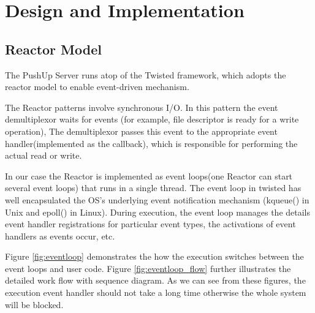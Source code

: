 \section {Design and Implementation\\}

\subsection{Reactor Model\\}
The PushUp Server runs atop of the Twisted framework\cite{Twisted}, which 
adopts the reactor model\cite{Reactor} to enable event-driven mechanism. 

The Reactor patterns involve synchronous I/O. In this pattern the event 
demultiplexor waits for events (for example, file descriptor is 
ready for a write operation), The demultiplexor passes this event to the
appropriate event handler(implemented as the callback), which is 
responsible for performing the actual read or write.

In our case the Reactor is implemented as event loops(one Reactor 
can start several event loops) that runs in a single thread. The
event loop in twisted has well encapsulated the OS's underlying 
event notification mechanism (kqueue() in Unix and epoll() in Linux).
During execution, the event loop manages the details event handler 
registrations for particular event types, the activations of event 
handlers as events occur, etc.

Figure \ref{fig:eventloop} demonstrates the how the execution switches
between the event loops and user code. Figure \ref{fig:eventloop_flow} 
further illustrates the detailed work flow with sequence diagram. As
we can see from these figures, the execution event handler should 
not take a long time otherwise the whole system will be blocked.

